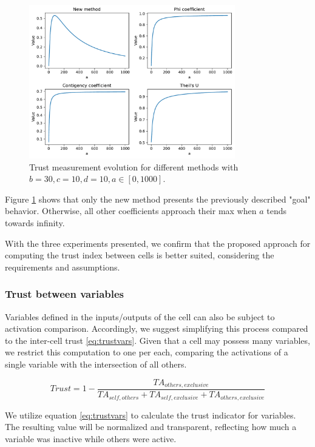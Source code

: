 \begin{figure}[h!]
\centering
    \includegraphics[width=0.8\textwidth]{figures/chapter4/cell/trust_tests/3.pdf}
    \caption{Trust measurement evolution for different methods with $b=30, c=10, d=10, a \in [0, 1000]$.}
    \label{fig:trust_test_3}
\end{figure}
\FloatBarrier

Figure \ref{fig:trust_test_3} shows that only the new method presents the previously described "goal" behavior. Otherwise, all other coefficients approach their max when $a$ tends towards infinity.

With the three experiments presented, we confirm that the proposed approach for computing the trust index between cells is better suited, considering the requirements and assumptions.

\subsubsection{Trust between variables}

Variables defined in the inputs/outputs of the cell can also be subject to activation comparison. Accordingly, we suggest simplifying this process compared to the inter-cell trust \ref{eq:trustvars}. Given that a cell may possess many variables, we restrict this computation to one per each, comparing the activations of a single variable with the intersection of all others.

\begin{equation} \label{eq:trustvars}
    Trust = 1 - \frac{TA_{others, exclusive}}{TA_{self,others} + TA_{self, exclusive} + TA_{others, exclusive}}
\end{equation}

We utilize equation \ref{eq:trustvars} to calculate the trust indicator for variables. The resulting value will be normalized and transparent, reflecting how much a variable was inactive while others were active.

